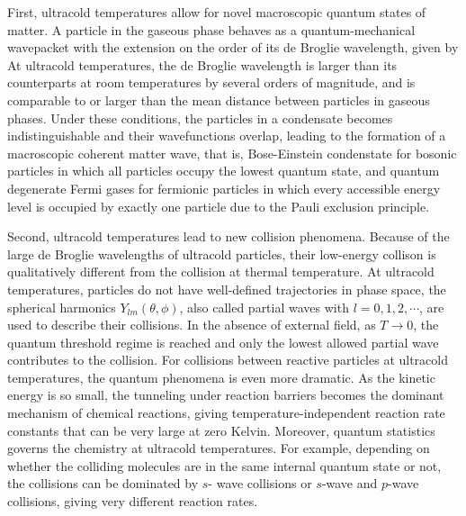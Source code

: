 First, ultracold temperatures allow for novel macroscopic quantum states of matter. A particle in the gaseous phase behaves as a quantum-mechanical 
wavepacket with the extension on the order of its de Broglie wavelength, given by
At ultracold temperatures, the de Broglie wavelength is larger than its counterparts at room temperatures by several orders of magnitude, 
and is comparable to or larger than the mean distance between particles in gaseous phases. Under these conditions,
the particles in a condensate becomes indistinguishable and their wavefunctions overlap, leading to the formation of
a macroscopic coherent matter wave, that is, Bose-Einstein condenstate\cite{ketterle2002, anglin2002} for bosonic 
particles in which all particles occupy the lowest quantum state, and quantum degenerate Fermi gases\cite{lev2002, stefano2008} for fermionic 
particles in which every accessible energy level is occupied by exactly one particle due to the Pauli exclusion principle. 

Second, ultracold temperatures lead to new collision phenomena.
Because of the large de Broglie wavelengths of ultracold particles, their low-energy collison is 
qualitatively different from the collision at thermal temperature. At ultracold temperatures, particles
do not have well-defined trajectories in phase space, the spherical harmonics $Y_{lm}(\theta, \phi)$, also called 
partial waves with $l = 0, 1, 2, \cdots$, are used to describe their collisions. In the absence of external field, as $T 
\rightarrow 0$, the quantum threshold regime is reached and only the lowest allowed partial wave contributes to the 
collision\cite{wigner1948, krems2005}. For collisions between reactive particles at ultracold temperatures, the quantum phenomena is
even more dramatic. As the kinetic energy is so small, the tunneling under reaction barriers becomes the 
dominant mechanism of chemical reactions, giving temperature-independent reaction rate constants that 
can be very large at zero Kelvin\cite{balakrishnan2001, bodo2002, bodo2004, weck2004}. Moreover, quantum statistics 
governs the chemistry at ultracold temperatures. For example, depending on 
whether the colliding molecules are in the same internal quantum state or not, the collisions can be dominated by $s$-
wave collisions or $s$-wave and $p$-wave collisions, giving very different reaction rates\cite{ospelkaus2010}. 

